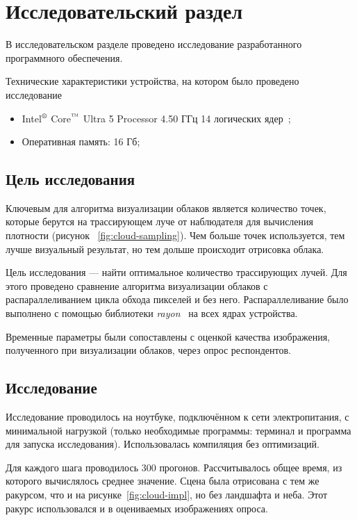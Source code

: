 \chapter{Исследовательский раздел}
В исследовательском разделе проведено исследование разработанного программного обеспечения.

Технические характеристики устройства, на котором было
проведено исследование~\cite{huawei}
\begin{itemize}
	\item Intel$\textsuperscript{\textregistered}$  Core$\textsuperscript{\texttrademark}$ Ultra 5 Processor 4.50 ГГц 14 логических ядер~\cite{intel_technical_specs}; 
	\item Оперативная память: 16 Гб;
\end{itemize}



\section{Цель исследования}

Ключевым для алгоритма визуализации облаков является количество точек, которые берутся на трассирующем луче от наблюдателя для вычисления плотности (рисунок ~\ref{fig:cloud-sampling}). Чем больше точек используется, тем лучше визуальный результат, но тем дольше происходит отрисовка облака.

Цель исследования — найти оптимальное количество трассирующих лучей. Для этого проведено сравнение алгоритма визуализации облаков с распараллеливанием цикла обхода пикселей и без него. Распараллеливание было выполнено с помощью библиотеки \textit{rayon}~\cite{rust_rayon} на всех ядрах устройства.

Временные параметры были сопоставлены с оценкой качества изображения, полученного при визуализации облаков, через опрос респондентов.

\section{Исследование}

Исследование проводилось на ноутбуке, подключённом к сети электропитания, с минимальной нагрузкой (только необходимые программы: терминал и программа для запуска исследования). Использовалась компиляция без оптимизаций.

Для каждого шага проводилось 300 прогонов. Рассчитывалось общее время, из которого вычислялось среднее значение. Сцена была отрисована с тем же ракурсом, что и на рисунке~\ref{fig:cloud-impl}, но без ландшафта и неба. Этот ракурс использовался и в оцениваемых изображениях опроса.

